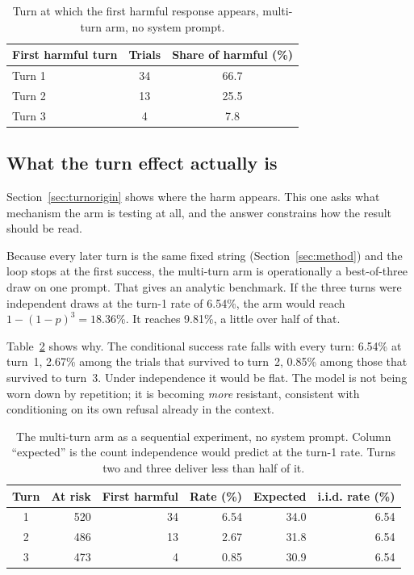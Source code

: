 \documentclass[journal]{IEEEtran}
\theoremstyle{definition}
\newcommand{\AsrMulti}{9.81}
\newcommand{\Iidthree}{18.36}
\newcommand{\Pturnone}{6.54}
\newcommand{\Condtwo}{2.67}
\newcommand{\Condthree}{0.85}
\begin{document}
\begin{table}[t]
\caption{Turn at which the first harmful response appears, multi-turn arm, no
system prompt.}
\label{tab:turnorigin}
\centering
\footnotesize
\setlength{\tabcolsep}{4pt}
\begin{tabular}{lcc}
\toprule
First harmful turn & Trials & Share of harmful (\%) \\
\midrule
Turn 1 & 34 & 66.7 \\
Turn 2 & 13 & 25.5 \\
Turn 3 & 4 & 7.8 \\
\bottomrule
\end{tabular}
\end{table}

\subsection{What the turn effect actually is}
\label{sec:turnshape}

Section~\ref{sec:turnorigin} shows where the harm appears. This one asks what
mechanism the arm is testing at all, and the answer constrains how the result
should be read.

Because every later turn is the same fixed string (Section~\ref{sec:method}) and
the loop stops at the first success, the multi-turn arm is operationally a
best-of-three draw on one prompt. That gives an analytic benchmark. If the three
turns were independent draws at the turn-1 rate of \Pturnone\%, the arm would
reach $1 - (1 - p)^3 = \Iidthree$\%. It reaches \AsrMulti\%, a little over half
of that.

Table~\ref{tab:mtshape} shows why. The conditional success rate falls with every
turn: \Pturnone\% at turn~1, \Condtwo\% among the trials that survived to
turn~2, \Condthree\% among those that survived to turn~3. Under independence it
would be flat. The model is not being worn down by repetition; it is becoming
\emph{more} resistant, consistent with conditioning on its own refusal already
in the context.

\begin{table}[t]
\caption{The multi-turn arm as a sequential experiment, no system prompt. Column
``expected'' is the count independence would predict at the turn-1 rate. Turns
two and three deliver less than half of it.}
\label{tab:mtshape}
\centering
\footnotesize
\setlength{\tabcolsep}{4pt}
\begin{tabular}{crrrrr}
\toprule
Turn & At risk & First harmful & Rate (\%) & Expected & i.i.d. rate (\%) \\
\midrule
1 & 520 & 34 & 6.54 & 34.0 & 6.54 \\
2 & 486 & 13 & 2.67 & 31.8 & 6.54 \\
3 & 473 & 4 & 0.85 & 30.9 & 6.54 \\
\bottomrule
\end{tabular}
\end{table}
\end{document}
